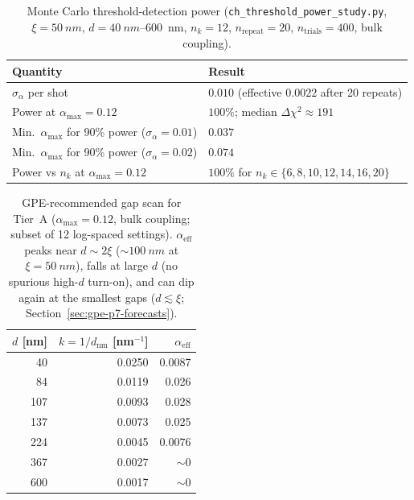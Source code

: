 \documentclass[11pt,a4paper]{article}
\begin{document}
\begin{table}[htbp]
  \centering
  \small
  \caption{Monte Carlo threshold-detection power (\texttt{ch\_threshold\_power\_study.py}, $\xi = \SI{50}{nm}$, $d = \SI{40}{nm}$--\SI{600}{nm}, $n_k = 12$, $n_{\mathrm{repeat}} = 20$, $n_{\mathrm{trials}} = 400$, bulk coupling).}
  \label{tab:power-study}
  \begin{tabular}{@{}ll@{}}
    \toprule
    Quantity & Result \\
    \midrule
  $\sigma_\alpha$ per shot & $0.010$ (effective $0.0022$ after 20 repeats) \\
  Power at $\alpha_{\max} = 0.12$ & $100\%$; median $\Delta\chi^2 \approx 191$ \\
  Min.\ $\alpha_{\max}$ for 90\% power ($\sigma_\alpha = 0.01$) & $0.037$ \\
  Min.\ $\alpha_{\max}$ for 90\% power ($\sigma_\alpha = 0.02$) & $0.074$ \\
  Power vs $n_k$ at $\alpha_{\max} = 0.12$ & $100\%$ for $n_k \in \{6,8,10,12,14,16,20\}$ \\
    \bottomrule
  \end{tabular}
\end{table}

\begin{table}[htbp]
  \centering
  \small
  \caption{GPE-recommended gap scan for Tier~A ($\alpha_{\max} = 0.12$, bulk coupling; subset of 12 log-spaced settings). $\alpha_{\mathrm{eff}}$ peaks near $d \sim 2\xi$ ($\sim \SI{100}{nm}$ at $\xi = \SI{50}{nm}$), falls at large $d$ (no spurious high-$d$ turn-on), and can dip again at the smallest gaps ($d \lesssim \xi$; Section~\ref{sec:gpe-p7-forecasts}).}
  \label{tab:gap-scan}
  \begin{tabular}{@{}rrr@{}}
    \toprule
    $d$ [nm] & $k = 1/d_{\mathrm{nm}}$ [nm$^{-1}$] & $\alpha_{\mathrm{eff}}$ \\
    \midrule
    40 & 0.0250 & 0.0087 \\
    84 & 0.0119 & 0.026 \\
    107 & 0.0093 & 0.028 \\
    137 & 0.0073 & 0.025 \\
    224 & 0.0045 & 0.0076 \\
    367 & 0.0027 & $\sim 0$ \\
    600 & 0.0017 & $\sim 0$ \\
    \bottomrule
  \end{tabular}
\end{table}
\end{document}
